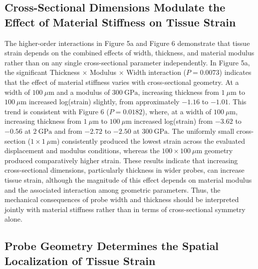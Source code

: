 \documentclass[fleqn,10pt]{wlscirep}
\begin{document}
\subsection{Cross-Sectional Dimensions Modulate the Effect of Material Stiffness on Tissue Strain}

The higher-order interactions in Figure 5a and Figure 6 demonstrate that tissue strain depends on the combined effects of width, thickness, and material modulus rather than on any single cross-sectional parameter independently. In Figure 5a, the significant Thickness $\times$ Modulus $\times$ Width interaction ($P = 0.0073$) indicates that the effect of material stiffness varies with cross-sectional geometry. At a width of $100~\mu\mathrm{m}$ and a modulus of $300~\mathrm{GPa}$, increasing thickness from $1~\mu\mathrm{m}$ to $100~\mu\mathrm{m}$ increased log(strain) slightly, from approximately $-1.16$ to $-1.01$. This trend is consistent with Figure 6 ($P = 0.0182$), where, at a width of $100~\mu\mathrm{m}$, increasing thickness from $1~\mu\mathrm{m}$ to $100~\mu\mathrm{m}$ increased log(strain) from $-3.62$ to $-0.56$ at $2~\mathrm{GPa}$ and from $-2.72$ to $-2.50$ at $300~\mathrm{GPa}$. The uniformly small cross-section ($1 \times 1~\mu\mathrm{m}$) consistently produced the lowest strain across the evaluated displacement and modulus conditions, whereas the $100 \times 100~\mu\mathrm{m}$ geometry produced comparatively higher strain. These results indicate that increasing cross-sectional dimensions, particularly thickness in wider probes, can increase tissue strain, although the magnitude of this effect depends on material modulus and the associated interaction among geometric parameters. Thus, the mechanical consequences of probe width and thickness should be interpreted jointly with material stiffness rather than in terms of cross-sectional symmetry alone.

\subsection{Probe Geometry Determines the Spatial Localization of Tissue Strain}
\end{document}
